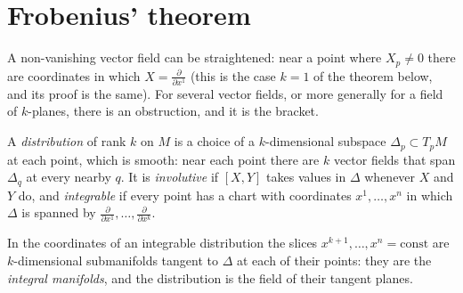 \section{Frobenius' theorem}

A non-vanishing vector field can be straightened: near a point where $X_p\ne0$ there are coordinates in which $X=\frac\partial{\partial x^1}$ (this is the
case $k=1$ of the theorem below, and its proof is the same). For several vector fields, or more generally for a field of $k$-planes, there is an
obstruction, and it is the bracket.

\begin{definition}
A \emph{distribution} of rank $k$ on $M$ is a choice of a $k$-dimensional subspace $\Delta_p\subset T_pM$ at each point, which is smooth: near each point
there are $k$ vector fields that span $\Delta_q$ at every nearby $q$. It is \emph{involutive} if $[X,Y]$ takes values in $\Delta$ whenever $X$ and $Y$ do, and
\emph{integrable} if every point has a chart with coordinates $x^1,\dots,x^n$ in which $\Delta$ is spanned by $\frac\partial{\partial x^1},\dots,\frac\partial{\partial x^k}$.
\end{definition}

In the coordinates of an integrable distribution the slices $x^{k+1},\dots,x^n=\text{const}$ are $k$-dimensional submanifolds tangent to $\Delta$ at each of their
points: they are the \emph{integral manifolds}, and the distribution is the field of their tangent planes.

